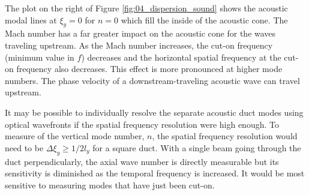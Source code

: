 The plot on the right of Figure \ref{fig:04_dispersion_sound} shows the acoustic modal lines at $\xi_y=0$ for $n=0$ which fill the inside of the acoustic cone.
The Mach number has a far greater impact on the acoustic cone for the waves traveling upstream.
As the Mach number increases, the cut-on frequency (minimum value in $f$) decreases and the horizontal spatial frequency at the cut-on frequency also decreases.
This effect is more pronounced at higher mode numbers.
The phase velocity of a downstream-traveling acoustic wave can travel upstream.

It may be possible to individually resolve the separate acoustic duct modes using optical wavefronts if the spatial frequency resolution were high enough.
To measure of the vertical mode number, $n$, the spatial frequency resolution would need to be $\Delta\xi_y\ge 1/2l_y$ for a square duct.
With a single beam going through the duct perpendicularly, the axial wave number is directly measurable but its sensitivity is diminished as the temporal frequency is increased.
It would be most sensitive to measuring modes that have just been cut-on.

